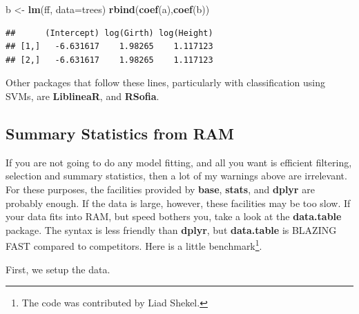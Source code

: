 \documentclass[]{book}
\newenvironment{Shaded}{\begin{snugshade}}{\end{snugshade}}
\newcommand{\DataTypeTok}[1]{\textcolor[rgb]{0.13,0.29,0.53}{#1}}
\newcommand{\KeywordTok}[1]{\textcolor[rgb]{0.13,0.29,0.53}{\textbf{#1}}}
\newcommand{\NormalTok}[1]{#1}
\newcommand{\StringTok}[1]{\textcolor[rgb]{0.31,0.60,0.02}{#1}}
\theoremstyle{definition}
\theoremstyle{definition}
\theoremstyle{definition}
\theoremstyle{remark}
\begin{document}
\begin{Shaded}
\begin{Highlighting}[]
\NormalTok{b <-}\StringTok{ }\KeywordTok{lm}\NormalTok{(ff, }\DataTypeTok{data=}\NormalTok{trees)}
\KeywordTok{rbind}\NormalTok{(}\KeywordTok{coef}\NormalTok{(a),}\KeywordTok{coef}\NormalTok{(b))}
\end{Highlighting}
\end{Shaded}

\begin{verbatim}
##      (Intercept) log(Girth) log(Height)
## [1,]   -6.631617    1.98265    1.117123
## [2,]   -6.631617    1.98265    1.117123
\end{verbatim}

Other packages that follow these lines, particularly with classification using SVMs, are \textbf{LiblineaR}, and \textbf{RSofia}.

\hypertarget{summary-statistics-from-ram}{%
\subsection{Summary Statistics from RAM}\label{summary-statistics-from-ram}}

If you are not going to do any model fitting, and all you want is efficient filtering, selection and summary statistics, then a lot of my warnings above are irrelevant.
For these purposes, the facilities provided by \textbf{base}, \textbf{stats}, and \textbf{dplyr} are probably enough.
If the data is large, however, these facilities may be too slow.
If your data fits into RAM, but speed bothers you, take a look at the \textbf{data.table} package.
The syntax is less friendly than \textbf{dplyr}, but \textbf{data.table} is BLAZING FAST compared to competitors.
Here is a little benchmark\footnote{The code was contributed by Liad Shekel.}.

First, we setup the data.
\end{document}
